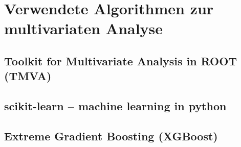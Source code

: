 \section{Verwendete Algorithmen zur multivariaten Analyse}
\label{ch:Algorithmen:subsec:Implementationen}

\subsection{Toolkit for Multivariate Analysis in ROOT (TMVA)}
\label{ch:Algorithmen:subsec:TMVA}

\subsection{scikit-learn -- machine learning in python}
\label{ch:Algorithmen:subsec:sklearn}

\subsection{Extreme Gradient Boosting (XGBoost)}
\label{ch:Algorithmen:subsec:XGB}
